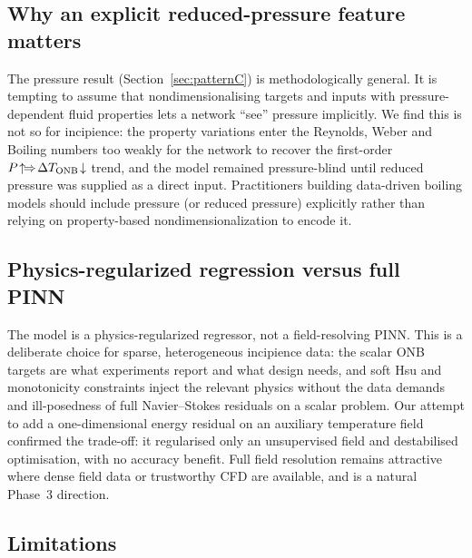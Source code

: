 \subsection{Why an explicit reduced-pressure feature matters}

The pressure result (Section~\ref{sec:patternC}) is methodologically general.
It is tempting to assume that nondimensionalising targets and inputs with
pressure-dependent fluid properties lets a network ``see'' pressure implicitly.
We find this is not so for incipience: the property variations enter the
Reynolds, Weber and Boiling numbers too weakly for the network to recover the
first-order $P\!\uparrow\!\Rightarrow\!\Delta T_{\mathrm{ONB}}\!\downarrow$ trend, and the model
remained pressure-blind until reduced pressure was supplied as a direct input.
Practitioners building data-driven boiling models should include pressure (or
reduced pressure) explicitly rather than relying on property-based
nondimensionalization to encode it.

\subsection{Physics-regularized regression versus full PINN}

The model is a physics-regularized regressor, not a field-resolving PINN. This
is a deliberate choice for sparse, heterogeneous incipience data: the scalar
ONB targets are what experiments report and what design needs, and soft Hsu and
monotonicity constraints inject the relevant physics without the data demands
and ill-posedness of full Navier--Stokes residuals on a scalar problem. Our
attempt to add a one-dimensional energy residual on an auxiliary temperature
field confirmed the trade-off: it regularised only an unsupervised field and
destabilised optimisation, with no accuracy benefit. Full field resolution
remains attractive where dense field data or trustworthy CFD are available, and
is a natural Phase~3 direction.

\subsection{Limitations}

